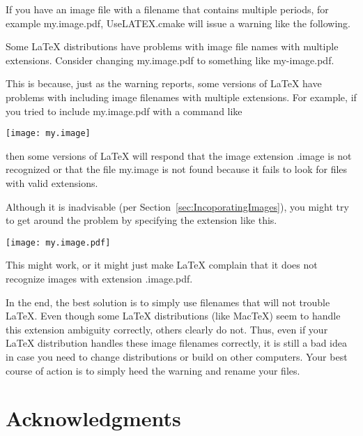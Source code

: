\documentclass{article}
\newcommand*{\textfile}[1]{\textsf{#1}}
\newcommand*{\UseLATEX}{\textfile{UseLATEX.cmake}\xspace}
\newcommand*{\latex}{\LaTeX\xspace}
\newcommand*{\mactex}{Mac\TeX\xspace}
\begin{document}
  If you have an image file with a filename that contains multiple periods,
  for example \textfile{my.image.pdf}, \UseLATEX will issue a warning like
  the following.

  \begin{CodeListing}
Some LaTeX distributions have problems with image file names
with multiple extensions.  Consider changing my.image.pdf to
something like my-image.pdf.
  \end{CodeListing}

  This is because, just as the warning reports, some versions of \latex
  have problems with including image filenames with multiple extensions.
  For example, if you tried to include \textfile{my.image.pdf} with a
  command like

  \begin{CodeListing}
\texttt{[image: my.image]}
  \end{CodeListing}

  then some versions of \latex will respond that the image extension
  \textfile{.image} is not recognized or that the file \textfile{my.image}
  is not found because it fails to look for files with valid extensions.

  Although it is inadvisable (per Section~\ref{sec:IncoporatingImages}),
  you might try to get around the problem by specifying the extension like
  this.

  \begin{CodeListing}
\texttt{[image: my.image.pdf]}
  \end{CodeListing}

  This might work, or it might just make \latex complain that it does not
  recognize images with extension \textfile{.image.pdf}.

  In the end, the best solution is to simply use filenames that will not
  trouble \latex.  Even though some \latex distributions (like \mactex)
  seem to handle this extension ambiguity correctly, others clearly do
  not.  Thus, even if your \latex distribution handles these image
  filenames correctly, it is still a bad idea in case you need to change
  distributions or build on other computers.  Your best course of action is
  to simply heed the warning and rename your files.


  
  \section{Acknowledgments}
\end{document}
